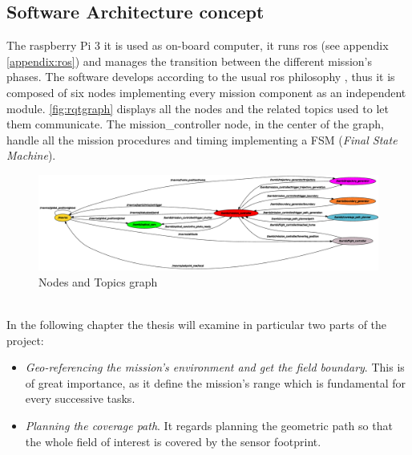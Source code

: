  \subsection{Software Architecture concept} %
 \label{sub:software_design}
 The raspberry Pi 3 it is used as on-board computer, it runs \acrshort{ros} (see appendix \ref{appendix:ros}) and manages the transition between the different mission's phases. The software develops according to the usual \acrshort{ros} philosophy \cite{288}, thus it is composed of six nodes implementing every mission component as an independent module. \autoref{fig:rqtgraph} displays all the nodes and the related topics used to let them communicate. The \textsf{mission\_controller} node, in the center of the graph, handle all the mission procedures and timing implementing a FSM (\textit{Final State Machine}).
\begin{figure}[ht]
    \centering
    \includegraphics[width=1.4\textwidth, angle=270]{figures/C1/rqtgraph.eps}
    \caption{Nodes and Topics graph}
    \label{fig:rqtgraph}
\end{figure}\\
 In the following chapter the thesis will examine in particular two parts of the project:
 \begin{itemize}
  	\item \textit{Geo-referencing the mission's environment and get the field boundary}. This is of great importance, as it define the mission's range which is fundamental for every successive tasks.
  	\item \textit{Planning the coverage path}. It regards planning the geometric path so that the whole field of interest is covered by the sensor footprint.
  \end{itemize}

